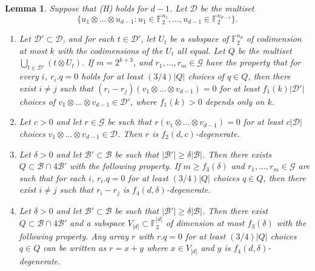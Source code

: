 \documentclass[11pt]{article}
\numberwithin{equation}{section}
\newtheorem{lemma}[theorem]{Lemma}
\theoremstyle{definition}
\theoremstyle{plain}
\newcommand\F{\mathbb{F}}
\renewcommand\d{\delta}
\newcommand \cB{\mathcal B}
\newcommand \cD{\mathcal D}
\newcommand \cG{\mathcal G}
\newcommand \s{\subset}
\begin{document}
\begin{lemma} \label{focusondeg}
  Suppose that (H) holds for $d-1$. Let $\cD$ be the multiset
  \[
    \{u_1\otimes \dots \otimes u_{d-1}:u_1\in \F_2^{n_1},\dots,u_{d-1}\in\F_2^{n_{d-1}}\}.
  \]
  
	
	\begin{enumerate}[label=(\roman*)]
		\item Let $\cD'\s \cD$, and for each $t\in \cD'$, let $U_t$ be a subspace of $\F_2^{n_d}$ of codimension at most $k$ with the codimensions of the $U_t$ all equal. Let $Q$ be the multiset $\bigcup_{t\in \cD'}(t\otimes U_t)$. If $m=2^{k+3}$, and $r_1,\dots,r_m\in \cG$ have the property that for every $i$, $r_i.q=0$ holds for at least $({3}/{4}) |Q|$ choices of $q\in Q$, then there exist $i\neq j$ such that $(r_i-r_j)(v_1\otimes \dots \otimes v_{d-1})=0$ for at least $f_1(k)|\cD'|$ choices of $v_1\otimes \dots \otimes v_{d-1}\in \cD'$, where $f_1(k)>0$ depends only on $k$.
		
		\item Let $c>0$ and let $r\in \cG$ be such that $r(v_1\otimes \dots \otimes v_{d-1})=0$ for at least $c|\cD|$ choices $v_1\otimes \dots\otimes v_{d-1}\in \cD$. Then $r$ is $f_2(d,c)$-degenerate.
		
		\item Let $\d>0$ and let $\cB'\s \cB$ be such that $|\cB'|\geq \d |\cB|$. Then there exists $Q\subset \cB\cap 4\cB'$ with the following property. If $m\geq f_3(\d)$ and $r_1,\dots,r_m\in \cG$ are such that for each $i$, $r_i.q=0$ for at least $({3}/{4})|Q|$ choices $q\in Q$, then there exist $i\neq j$ such that $r_i-r_j$ is $f_4(d,\d)$-degenerate.
		
		\item Let $\d>0$ and let $\cB'\s \cB$ be such that $|\cB'|\geq \d |\cB|$. Then there exist $Q\subset \cB\cap 4\cB'$ and a subspace $V_{\lbrack d\rbrack}\s \F_2^{\lbrack d\rbrack}$ of dimension at most $f_3(\d)$ with the following property. Any array $r$ with $r.q=0$ for at least $({3}/{4})|Q|$ choices $q\in Q$ can be written as $r=x+y$ where $x\in V_{\lbrack d \rbrack}$ and $y$ is $f_4(d,\d)$-degenerate.
	\end{enumerate}
\end{lemma}
\end{document}
